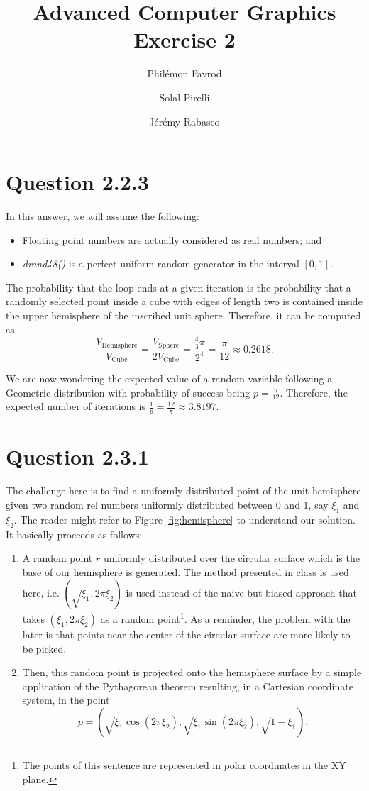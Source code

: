 \documentclass{article}
\title{Advanced Computer Graphics\\Exercise 2}
\author{Phil\'emon Favrod \and Solal Pirelli \and J\'er\'emy Rabasco}
\begin{document}
\maketitle

\section*{Question 2.2.3}
In this answer, we will assume the following:
\begin{itemize}
\item Floating point numbers are actually considered as real numbers; and
\item \textit{drand48()} is a perfect uniform random generator in the interval $[0, 1]$.
\end{itemize}
The probability that the loop ends at a given iteration is the probability that a randomly selected point inside a cube with edges of length two is contained inside the upper hemisphere of the inscribed unit sphere. Therefore, it can be computed as
$$
\frac{V_{\text{Hemisphere}}}{V_{\text{Cube}}} = \frac{V_{\text{Sphere}}}{2V_{\text{Cube}}} = \frac{\frac{4}{3}\pi}{2^4} = \frac{\pi}{12} \approx 0.2618. 
$$

We are now wondering the expected value of a random variable following a Geometric distribution with probability of success being $p = \frac{\pi}{12}$. Therefore,
the expected number of iterations is $\frac 1p = \frac{12}{\pi} \approx 3.8197$.

\section*{Question 2.3.1}
The challenge here is to find a uniformly distributed point of the unit hemisphere given two random rel numbers uniformly distributed between 0 and 1, say $\xi_1$ and $\xi_2$. The reader might refer to Figure \ref{fig:hemisphere} to understand our solution. It basically proceeds as follows:
\begin{enumerate}[1.]
\item A random point $r$ uniformly distributed over the circular surface which is the base of our hemisphere is generated. The method presented in class is used here, i.e. $(\sqrt{\xi_1}, 2\pi\xi_2)$ is used instead of the naive but biased approach that takes $(\xi_1, 2\pi\xi_2)$ as a random point\footnote{The points of this sentence are represented in polar coordinates in the XY plane.}. As a reminder, the problem with the later is that points near the center of the circular surface are more likely to be picked. 
\item Then, this random point is projected onto the hemisphere surface by a simple application of the Pythagorean theorem resulting, in a Cartesian coordinate system, in the point
$$
p = (\sqrt{\xi_1}\cos{\left( 2\pi\xi_2\right)}, \sqrt{\xi_1}\sin{\left( 2\pi\xi_2\right)}, \sqrt{1 - \xi_1}).
$$
\end{enumerate}
\end{document}
